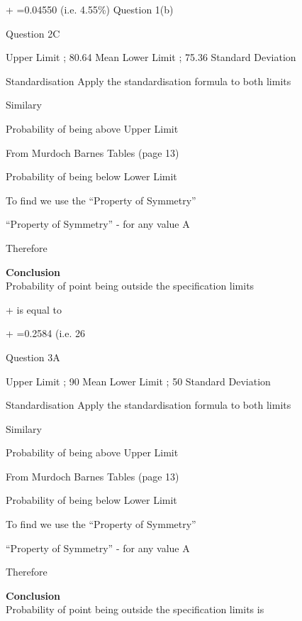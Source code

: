 ﻿\documentclass[]{report}
\begin{document}
+ =0.04550 	(i.e. 4.55\%) Question 1(b)
















Question 2C

Upper Limit ; 80.64		Mean		 	
Lower Limit ; 75.36		Standard Deviation	 

Standardisation
Apply the standardisation formula	 	to both limits


Similary



Probability of being above Upper Limit

From Murdoch Barnes Tables (page 13)  

Probability of being below Lower Limit


To find   we use the “Property of Symmetry”

“Property of Symmetry” -   for any value A

Therefore 

\noindent \textbf{Conclusion}\\
Probability of point being outside the specification limits 

+ is equal to

+ =0.2584 	(i.e. 26%


\bigskip		


Question 3A

Upper Limit ; 90		Mean		 	
Lower Limit ; 50		Standard Deviation	 

Standardisation
Apply the standardisation formula	 	to both limits


Similary



Probability of being above Upper Limit

From Murdoch Barnes Tables (page 13)  

Probability of being below Lower Limit


To find   we use the “Property of Symmetry”

“Property of Symmetry” -   for any value A

Therefore 

\noindent \textbf{Conclusion}\\
Probability of point being outside the specification limits is
\end{document}
